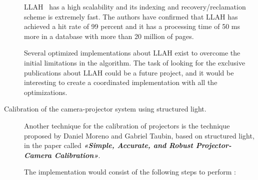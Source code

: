 \begin{description}
LLAH~\cite{Nakai} has a high scalability and its indexing and recovery/reclamation scheme is extremely fast. The authors have confirmed that LLAH has achieved a hit rate of 99 percent and it has a processing time of 50 ms more in a database with more than 20 million of pages. 

Several optimized implementations about LLAH exist to overcome the initial limitations in the algorithm. The task of looking for the exclusive publications about LLAH could be a future project, and it would be interesting to create a coordinated implementation with all the optimizations.




\item[Calibration of the camera-projector system using structured light.] Another technique for the calibration of projectors is the technique proposed by Daniel Moreno and Gabriel Taubin, based on structured light, in the paper called \textbf{\textit{«Simple, Accurate, and Robust Projector-Camera Calibration»}}. 

The implementation would consist of the following steps to perform \cite{Moreno}:


\end{description}
